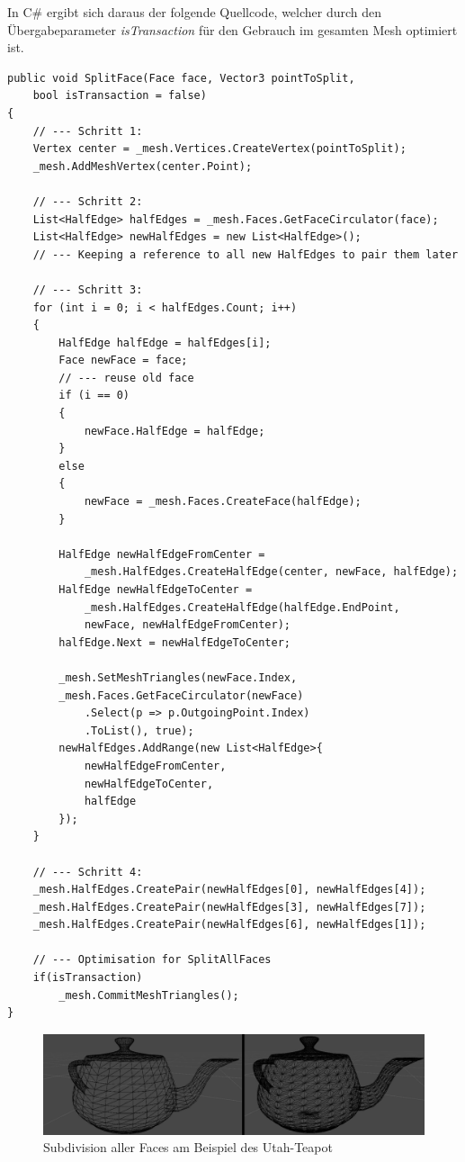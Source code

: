 In C\# ergibt sich daraus der folgende Quellcode, welcher durch den \"Ubergabe\-para\-meter \textit{isTransaction} f\"ur den Gebrauch im gesamten Mesh optimiert ist.
\begin{lstlisting}
public void SplitFace(Face face, Vector3 pointToSplit,
	bool isTransaction = false)
{
	// --- Schritt 1:
	Vertex center = _mesh.Vertices.CreateVertex(pointToSplit);
	_mesh.AddMeshVertex(center.Point);

	// --- Schritt 2:
	List<HalfEdge> halfEdges = _mesh.Faces.GetFaceCirculator(face);
	List<HalfEdge> newHalfEdges = new List<HalfEdge>(); 
	// --- Keeping a reference to all new HalfEdges to pair them later

	// --- Schritt 3:
	for (int i = 0; i < halfEdges.Count; i++)
	{
		HalfEdge halfEdge = halfEdges[i];
		Face newFace = face;
		// --- reuse old face
		if (i == 0)      
		{
			newFace.HalfEdge = halfEdge;
		}
		else
		{
			newFace = _mesh.Faces.CreateFace(halfEdge);
		}

		HalfEdge newHalfEdgeFromCenter =
			_mesh.HalfEdges.CreateHalfEdge(center, newFace, halfEdge);
		HalfEdge newHalfEdgeToCenter =
			_mesh.HalfEdges.CreateHalfEdge(halfEdge.EndPoint, 
			newFace, newHalfEdgeFromCenter);
		halfEdge.Next = newHalfEdgeToCenter;

		_mesh.SetMeshTriangles(newFace.Index,
		_mesh.Faces.GetFaceCirculator(newFace)
			.Select(p => p.OutgoingPoint.Index)
			.ToList(), true);
		newHalfEdges.AddRange(new List<HalfEdge>{ 
			newHalfEdgeFromCenter, 
			newHalfEdgeToCenter, 
			halfEdge 
		});
	}
	
	// --- Schritt 4:
	_mesh.HalfEdges.CreatePair(newHalfEdges[0], newHalfEdges[4]);
	_mesh.HalfEdges.CreatePair(newHalfEdges[3], newHalfEdges[7]);
	_mesh.HalfEdges.CreatePair(newHalfEdges[6], newHalfEdges[1]);

	// --- Optimisation for SplitAllFaces
	if(isTransaction)
		_mesh.CommitMeshTriangles();
}
\end{lstlisting}
\begin{figure}[H]
	\centering
	\includegraphics[width=0.9\linewidth]{Images/SubdivisionDemo}
	\caption{Subdivision aller Faces am Beispiel des Utah-Teapot}
	\label{fig:subdivisiondemo}
\end{figure}


